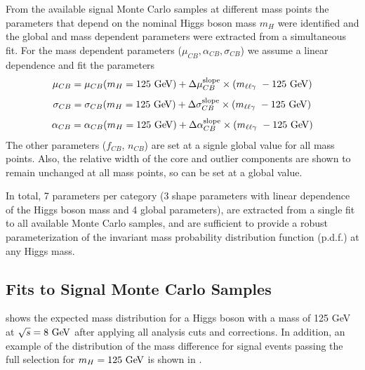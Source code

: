 From the available signal Monte Carlo samples at different mass points the parameters
that depend on the nominal Higgs boson mass $m_H$ were identified and the global
and mass dependent parameters were extracted from a simultaneous fit. For the mass
dependent parameters ($\mu_{CB}, \alpha_{CB}, \sigma_{CB}$) we assume a linear
dependence and fit the parameters
\[
\mu_{CB} = \mu_{CB}(m_H = 125 \GeV) + \Delta \mu_{CB}^{\text{slope}} \times \left(\mllg - 125 \GeV \right)
\]
\[
\sigma_{CB} = \sigma_{CB}(m_H = 125 \GeV) + \Delta \sigma_{CB}^{\text{slope}} \times \left(\mllg - 125 \GeV \right)
\]
\[
\alpha_{CB} = \alpha_{CB}(m_H = 125 \GeV) + \Delta \alpha_{CB}^{\text{slope}} \times \left(\mllg - 125 \GeV \right)
\]
The other parameters ($f_{CB}$, $n_{CB}$) are set at a signle global value for all
mass points. Also, the relative width of the core and outlier components are shown
to remain unchanged at all mass points, so can be set at a global value.

In total, 7 parameters per category (3 shape parameters with linear dependence of
the Higgs boson mass and 4 global parameters), are extracted from a single fit to
all available Monte Carlo samples, and are sufficient to provide a robust 
parameterization of the invariant mass probability distribution function (p.d.f.)
at any Higgs mass.

\subsection{Fits to Signal Monte Carlo Samples}

 shows the expected mass distribution for
a Higgs boson with a mass of 125 GeV at $\rts = 8 \GeV$ 
after applying all analysis cuts and corrections.
In addition, an example of the distribution of the mass difference 
\dm for signal events passing the full selection for $m_H = 125  \GeV$ is shown in 
.

